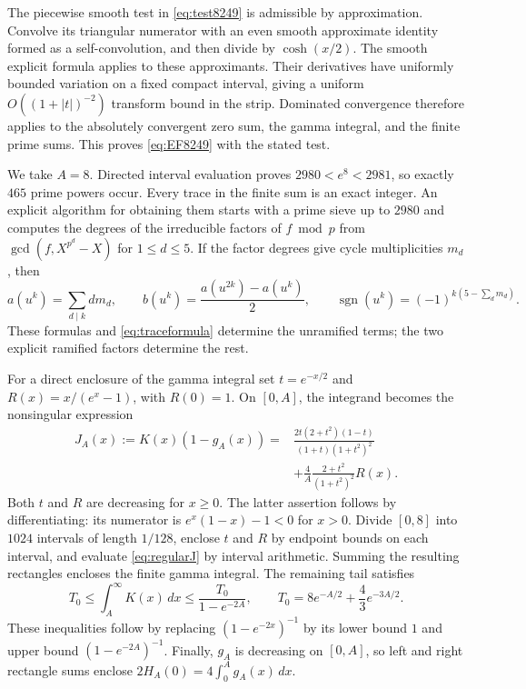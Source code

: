 \documentclass[11pt]{article}
\theoremstyle{definition}
\theoremstyle{remark}
\newcommand{\dd}{\,d}
\numberwithin{equation}{section}
\begin{document}
The piecewise smooth test in \eqref{eq:test8249} is admissible by approximation. Convolve its triangular numerator with an even smooth approximate identity formed as a self-convolution, and then divide by $\cosh(x/2)$. The smooth explicit formula applies to these approximants. Their derivatives have uniformly bounded variation on a fixed compact interval, giving a uniform $O((1+|t|)^{-2})$ transform bound in the strip. Dominated convergence therefore applies to the absolutely convergent zero sum, the gamma integral, and the finite prime sums. This proves \eqref{eq:EF8249} with the stated test.

We take $A=8$. Directed interval evaluation proves $2980<e^8<2981$, so exactly $465$ prime powers occur. Every trace in the finite sum is an exact integer. An explicit algorithm for obtaining them starts with a prime sieve up to $2980$ and computes the degrees of the irreducible factors of $f\bmod p$ from
$\gcd(f,X^{p^d}-X)$ for $1\le d\le5$. If the factor degrees give cycle multiplicities $m_d$, then
\[
a(u^k)=\sum_{d\mid k}dm_d,\qquad
b(u^k)=\frac{a(u^{2k})-a(u^k)}2,\qquad
\operatorname{sgn}(u^k)=(-1)^{k(5-\sum_d m_d)}.
\]
These formulas and \eqref{eq:traceformula} determine the unramified terms; the two explicit ramified factors determine the rest.

For a direct enclosure of the gamma integral set
$t=e^{-x/2}$ and $R(x)=x/(e^x-1)$, with $R(0)=1$. On $[0,A]$, the integrand becomes the nonsingular expression
\begin{equation}\label{eq:regularJ}
\begin{split}
J_A(x):=K(x)(1-g_A(x))
={}&\frac{2t(2+t^2)(1-t)}{(1+t)(1+t^2)^2}\\
&+\frac4A\frac{2+t^2}{(1+t^2)^2}R(x).
\end{split}
\end{equation}
Both $t$ and $R$ are decreasing for $x\ge0$. The latter assertion follows by differentiating: its numerator is $e^x(1-x)-1<0$ for $x>0$. Divide $[0,8]$ into $1024$ intervals of length $1/128$, enclose $t$ and $R$ by endpoint bounds on each interval, and evaluate \eqref{eq:regularJ} by interval arithmetic. Summing the resulting rectangles encloses the finite gamma integral. The remaining tail satisfies
\begin{equation}\label{eq:gammatail}
T_0\le\int_A^\infty K(x)\dd x\le\frac{T_0}{1-e^{-2A}},
\qquad
T_0=8e^{-A/2}+\frac43e^{-3A/2}.
\end{equation}
These inequalities follow by replacing $(1-e^{-2x})^{-1}$ by its lower bound $1$ and upper bound $(1-e^{-2A})^{-1}$. Finally, $g_A$ is decreasing on $[0,A]$, so left and right rectangle sums enclose
$2H_A(0)=4\int_0^A g_A(x)\dd x$.
\end{document}

